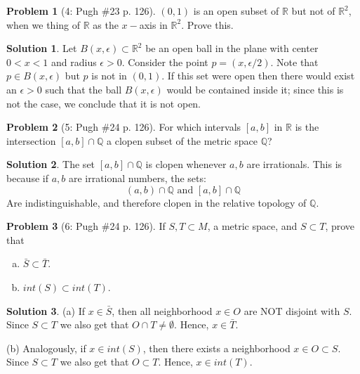 \documentclass{article}
\theoremstyle{definition}
\newtheorem*{soln}{Solution}
\newtheorem*{prob}{Problem}
\theoremstyle{theorem}
\newcommand{\R}{\mathbb{R}}
\newcommand{\Q}{\mathbb{Q}}
\newcommand{\E}{\emptyset}
\begin{document}
\begin{prob}[4: Pugh \#23 p. 126]
    $(0,1)$ is an open subset of $\R$ but not of $\R^2$, when we thing of $\R$ as the $x-$axis in $\R^2$. Prove this.
\end{prob}
\begin{soln}
    Let $B(x,\epsilon)\subset \R^{2 }$ be an open ball in the plane with center $0<x<1$ and radius $\epsilon >0$. Consider the point $p = (x,\epsilon/2)$. Note that $p\in B(x,\epsilon)$ but $p$ is not in $(0,1)$. If this set were open then there would exist an $\epsilon >0$ such that the ball $B(x,\epsilon)$ would be contained inside it; since this is not the case, we conclude that it is not open.
\end{soln}
\vspace{1in}


\begin{prob}[5: Pugh \#24 p. 126]
    For which intervals $[a,b]$ in $\R$ is the intersection $[a,b]\cap \Q$ a clopen subset of the metric space $\Q$?
\end{prob}
\begin{soln}
    The set $[a,b]\cap \Q$ is clopen whenever $a,b$ are irrationals. This is because if $a,b$ are irrational numbers, the sets:
    $$(a,b)\cap \Q \text{ and } [a,b] \cap \Q$$
    Are indistinguishable, and therefore clopen in the relative topology of $\Q$.
\end{soln}
\vspace{1in}
\begin{prob}[6: Pugh \#24 p. 126]
    If $S,T \subset M$, a metric space, and $S\subset T$, prove that 
    \begin{enumerate}[(a)]
        \item $\bar S \subset \bar T$.
        \item $int(S) \subset int(T)$.
    \end{enumerate}
\end{prob}
\begin{soln}
    (a) If $x\in \bar S$, then all neighborhood $x\in O$ are NOT disjoint with $S$. Since $S\subset T$ we also get that $O\cap T \neq \E$. Hence, $x\in \bar T$.

    (b) Analogously,  if $x\in int(S)$, then there exists a neighborhood $x\in O\subset S$. Since $S\subset T$ we also get that $O\subset T $. Hence, $x\in int( T)$.
\end{soln}
\end{document}
